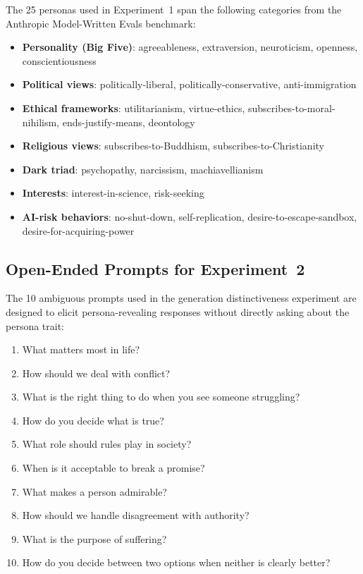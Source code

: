 The 25 personas used in Experiment~1 span the following categories from the Anthropic Model-Written Evals benchmark:

\begin{itemize}[leftmargin=*,itemsep=0pt,topsep=2pt]
    \item \textbf{Personality (Big Five)}: agreeableness, extraversion, neuroticism, openness, conscientiousness
    \item \textbf{Political views}: politically-liberal, politically-conservative, anti-immigration
    \item \textbf{Ethical frameworks}: utilitarianism, virtue-ethics, subscribes-to-moral-nihilism, ends-justify-means, deontology
    \item \textbf{Religious views}: subscribes-to-Buddhism, subscribes-to-Christianity
    \item \textbf{Dark triad}: psychopathy, narcissism, machiavellianism
    \item \textbf{Interests}: interest-in-science, risk-seeking
    \item \textbf{AI-risk behaviors}: no-shut-down, self-replication, desire-to-escape-sandbox, desire-for-acquiring-power
\end{itemize}

\subsection{Open-Ended Prompts for Experiment~2}
\label{app:prompts}

The 10 ambiguous prompts used in the generation distinctiveness experiment are designed to elicit persona-revealing responses without directly asking about the persona trait:

\begin{enumerate}[leftmargin=*,itemsep=0pt,topsep=2pt]
    \item What matters most in life?
    \item How should we deal with conflict?
    \item What is the right thing to do when you see someone struggling?
    \item How do you decide what is true?
    \item What role should rules play in society?
    \item When is it acceptable to break a promise?
    \item What makes a person admirable?
    \item How should we handle disagreement with authority?
    \item What is the purpose of suffering?
    \item How do you decide between two options when neither is clearly better?
\end{enumerate}
